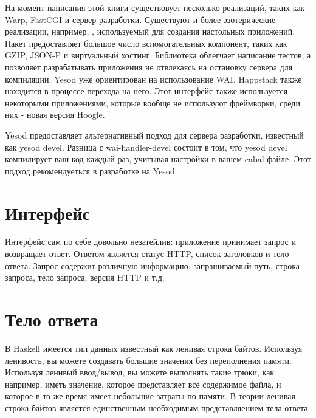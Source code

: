 На момент написания этой книги существовует несколько реализаций, таких как Warp, FastCGI и
сервер разработки. Существуют и более эзотерические реализации, например,
,
используемый для создания настольных приложений. Пакет  предоставляет большое число вспомогательных компонент, таких как  GZIP, JSON-P
и виртуальный хостинг. Библиотека 
облегчает написание тестов, а  позволяет разрабатывать приложения не отвлекаясь на остановку сервера для компиляции.
Yesod уже ориентирован на использование WAI, Happstack также находится в процессе перехода на него.
Этот интерфейс также используется некоторыми приложениями, которые вообще не используют фреймворки, среди
них - новая версия Hoogle.

\begin{remark}
Yesod предоставляет альтернативный подход для сервера разработки, известный как
yesod devel. Разница с wai-handler-devel состоит в том, что yesod devel компилирует
ваш код каждый раз, учитывая настройки в вашем cabal-файле.
Этот подход рекомендуеться в разработке на Yesod.
\end{remark}

\section {Интерфейс}

Интерфейс сам по себе довольно незатейлив: приложение принимает запрос и возвращает
ответ. Ответом является статус HTTP, список заголовков и тело ответа.
Запрос содержит различную информацию: запрашиваемый путь, строка запроса, тело запроса,
версия HTTP и т.д.

\section {Тело ответа}

В Haskell имеется тип данных известный как ленивая строка байтов. Используя ленивость,
вы можете создавать большие значения без переполнения памяти. Используя ленивый ввод/вывод,
вы можете выполнять такие трюки, как например, иметь значение, которое представляет всё 
содержимое файла, и которое в то же время имеет небольшие затраты по памяти. В теории
ленивая строка байтов является единственным необходимым представляением тела ответа.


